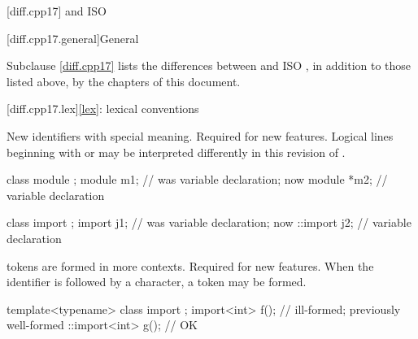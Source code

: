 [diff.cpp17]{\Cpp{} and ISO \CppXVII{}}

[diff.cpp17.general]{General}

\pnum
{}%
Subclause \ref{diff.cpp17} lists the differences between \Cpp{} and
ISO \CppXVII{},
in addition to those listed above,
by the chapters of this document.

[diff.cpp17.lex]{\ref*{lex}: lexical conventions}

\change
New identifiers with special meaning.
\rationale
Required for new features.
\effect
Logical lines beginning with
 or  may
be interpreted differently
in this revision of \Cpp{}.
\begin{example}
\begin{codeblock}
class module {};
module m1;          // was variable declaration; now 
module *m2;         // variable declaration

class import {};
import j1;          // was variable declaration; now 
::import j2;        // variable declaration
\end{codeblock}
\end{example}

\change
{} tokens are formed in more contexts.
\rationale
Required for new features.
\effect
When the identifier 
is followed by a \tcode{<} character,
a  token may be formed.
\begin{example}
\begin{codeblock}
template<typename> class import {};
import<int> f();                // ill-formed; previously well-formed
::import<int> g();              // OK
\end{codeblock}
\end{example}


